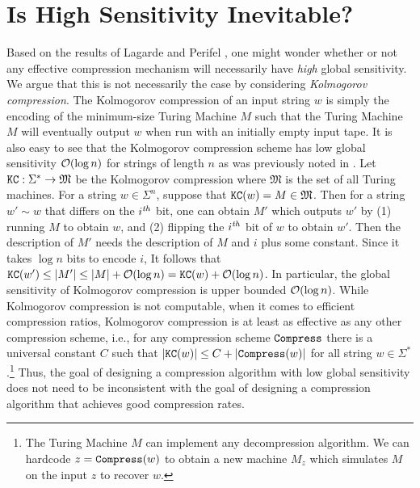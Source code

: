 \section{Is High Sensitivity Inevitable?}

Based on the results of Lagarde and Perifel \cite{lagarde2018lempel}, one might wonder whether or not any effective compression mechanism will necessarily have \emph{high} global sensitivity. We argue that this is not necessarily the case by considering \emph{Kolmogorov compression}. The Kolmogorov compression of an input string $w$ is simply the encoding of the minimum-size Turing Machine $M$ such that the Turing Machine $M$ will eventually output $w$ when run with an initially empty input tape. It is also easy to see that the Kolmogorov compression scheme has low global sensitivity $\O{\log n}$  for strings of length $n$ as was previously noted in \cite{AFI23}. Let $\mathtt{KC}:\Sigma^*\rightarrow\mathfrak{M}$ be the Kolmogorov compression where $\mathfrak{M}$ is the set of all Turing machines. For a string $w\in\Sigma^n$, suppose that $\mathtt{KC}(w)=M\in\mathfrak{M}$. Then for a string $w'\sim w$ that differs on the $i^{\mbox{\scriptsize{\textit{th}}}}$ bit, one can obtain $M'$ which outputs $w'$ by (1) running $M$ to obtain $w$, and (2) flipping the $i^{\mbox{\scriptsize{\textit{th}}}}$ bit of $w$ to obtain $w'$. Then the description of $M'$ needs the description of $M$ and $i$ plus some constant. Since it takes $\log n$ bits to encode $i$, It follows that $\kc(w') \leq \left| M'\right| \leq |M| + \O{\log n} = \kc(w) + \O{\log n}$. In particular, the global sensitivity of Kolmogorov compression is upper bounded $\O{\log n}$. While  Kolmogorov compression is not computable, when it comes to efficient compression ratios, Kolmogorov compression is at least as effective as any other compression scheme, i.e., for any compression scheme $\mathtt{Compress}$ there is a universal constant $C$ such that $\left|\mathtt{KC}(w)\right| \leq C + \left|\mathtt{Compress}(w)\right|$ for all string $w \in \Sigma^*$.\footnote{The Turing Machine $M$ can implement any decompression algorithm. We can hardcode $z=\mathtt{Compress}(w)$ to obtain a new machine $M_z$ which simulates $M$ on the input $z$ to recover $w$.} Thus, the goal of designing a compression algorithm with low global sensitivity does not need to be inconsistent with the goal of designing a compression algorithm that achieves good compression rates. 



